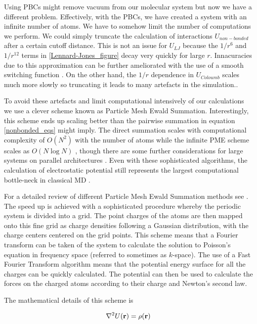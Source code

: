 Using PBCs might remove vacuum from our molecular system but now we have a different problem. Effectively, with the PBCs, we have created a system with an infinite number of atoms. We have to somehow limit the number of computations we perform. We could simply truncate the calculation of interactions $U_{non-bonded}$ after a certain cutoff distance. This is not an issue for $U_{LJ}$ because the $1/r^6$ and $1/r^{12}$ terms in \ref{Lennard-Jones_figure} decay very quickly for large $r$. Innacuracies due to this approximation can be further ameliorated with the use of a smooth switching function \cite{}. On the other hand, the $1/r$ dependence in $U_{Coloumb}$ scales much more slowly so truncating it leads to many artefacts in the simulation.\cite{auffinger1995}\cite{perera1995}\cite{roberts1994}\cite{delbuono1996}\cite{essmann1995}. 

To avoid these artefacts and limit computational intensively of our calculations we use a clever scheme known as Particle Mesh Ewald Summation. Interestingly, this scheme ends up scaling better than the pairwise summation in equation \ref{nonbonded_eqs} might imply. The direct summation scales with computational complexity of $O(N^2)$  with the number of atoms while the infinite PME scheme scales as $O (N\log N)$ \cite{darden1993}, though there are some further considerations for large systems on parallel architectures \cite{hardy2015}. Even with these sophisticated algorithms, the calculation of electrostatic potential still represents the largest computational bottle-neck in classical MD \cite{hardy2015}.

For a detailed review of different Particle Mesh Ewald Summation methods see \cite{shan2005}. The speed up is achieved with a sophisticated procedure whereby the periodic system is divided into a grid. The point charges of the atoms are then mapped onto this fine grid as charge densities following a Gaussian distribution, with the charge centers centered on the grid points. This scheme means that a Fourier transform can be taken of the system to calculate the solution to Poisson's equation in frequency space (referred to sometimes as $k$-space). The use of a Fast Fourier Transform algorithm means that the potential energy surface for all the charges can be quickly calculated. The potential can then be used to calculate the forces on the charged atoms according to their charge and Newton's second law.

The mathematical details of this scheme  is 

\begin{equation}
	\label {Poissons_equation}
	\nabla^2 U(\bold{r})  = \rho (\bold{r})
\end{equation}


